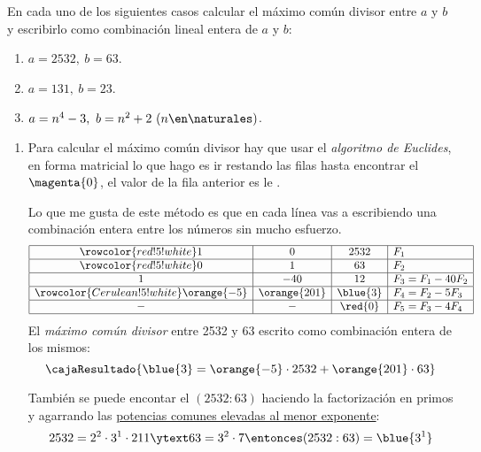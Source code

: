\begin{enunciado}{\ejercicio}
  En cada uno de los siguientes casos calcular el máximo común divisor entre $a$ y $b$ y escribirlo como combinación lineal entera de $a$ y $b$:
  \begin{enumerate}[label=\roman*)]
    \item $a = 2532,\ b = 63$.
    \item $a = 131,\ b = 23$.
    \item $a = n^4 - 3,\ b = n^2 + 2\ (n \en \naturales)$.
  \end{enumerate}
\end{enunciado}

\begin{enumerate}[label=\roman*)]
  \item
        Para calcular el máximo común divisor hay que usar el \textit{algoritmo de Euclides}, en forma matricial
        lo que hago es ir restando las filas hasta encontrar el $\magenta{0}$, el valor de la fila anterior es le .

        Lo que me gusta de este método es que en cada línea vas a escribiendo una combinación entera
        entre los números sin mucho esfuerzo.
        $$
          \begin{array}{|c|c|c|l|} \hline\rowcolor{red!5!white}
            1           & 0            & 2532     & F_1               \\ \hline\rowcolor{red!5!white}
            0           & 1            & 63       & F_2               \\ \hline
            1           & -40          & 12       & F_3 = F_1 - 40F_2 \\ \hline \rowcolor{Cerulean!5!white}
            \orange{-5} & \orange{201} & \blue{3} & F_4 = F_2 - 5F_3  \\ \hline
            -           & -            & \red{0}  & F_5 = F_3 - 4F_4  \\ \hline
          \end{array}
        $$
        El \textit{máximo común divisor} entre 2532 y 63 escrito como combinación entera de los mismos:
        $$
          \cajaResultado{
            \blue{3} = \orange{-5} \cdot 2532 + \orange{201} \cdot 63
          }
        $$

        También se puede encontar el $(2532 : 63)$ haciendo la factorización en primos
        y agarrando las \ul{potencias comunes elevadas al menor exponente}:
        $$
          2532 = 2^2 \cdot 3^1 \cdot 211
          \ytext
          63 = 3^2 \cdot 7
          \entonces
          (2532 : 63) = \blue{3^1}
        $$


\end{enumerate}

